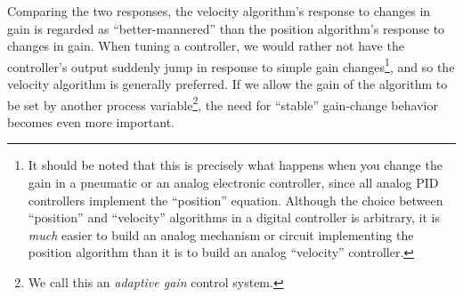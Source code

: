 Comparing the two responses, the velocity algorithm's response to changes in gain is regarded as ``better-mannered'' than the position algorithm's response to changes in gain.  When tuning a controller, we would rather not have the controller's output suddenly jump in response to simple gain changes\footnote{It should be noted that this is precisely what happens when you change the gain in a pneumatic or an analog electronic controller, since all analog PID controllers implement the ``position'' equation.  Although the choice between ``position'' and ``velocity'' algorithms in a digital controller is arbitrary, it is \textit{much} easier to build an analog mechanism or circuit implementing the position algorithm than it is to build an analog ``velocity'' controller.}, and so the velocity algorithm is generally preferred.  If we allow the gain of the algorithm to be set by another process variable\footnote{We call this an \textit{adaptive gain} control system.}, the need for ``stable'' gain-change behavior becomes even more important.


























